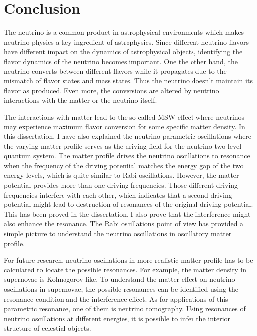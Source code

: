 \chapter{\label{chap:conclusion}Conclusion}


The neutrino is a common product in astrophysical environments which makes neutrino physics a key ingredient of astrophysics. Since different neutrino flavors have different impact on the dynamics of astrophysical objects, identifying the flavor dynamics of the neutrino becomes important. One the other hand, the neutrino converts between different flavors while it propagates due to the mismatch of flavor states and mass states. Thus the neutrino doesn't maintain its flavor as produced. Even more, the conversions are altered by neutrino interactions with the matter or the neutrino itself. 

The interactions with matter lead to the so called MSW effect where neutrinos may experience maximum flavor conversion for some specific matter density. In this dissertation, I have also explained the neutrino parametric oscillations where the varying matter profile serves as the driving field for the neutrino two-level quantum system. The matter profile drives the neutrino oscillations to resonance when the frequency of the driving potential matches the energy gap of the two energy levels, which is quite similar to Rabi oscillations. However, the matter potential provides more than one driving frequencies. Those different driving frequencies interfere with each other, which indicates that a second driving potential might lead to destruction of resonances of the original driving potential. This has been proved in the dissertation. I also prove that the interference might also enhance the resonance. The Rabi oscillations point of view has provided a simple picture to understand the neutrino oscillations in oscillatory matter profile.

For future research, neutrino oscillations in more realistic matter profile has to be calculated to locate the possible resonances. For example, the matter density in supernovae is Kolmogorov-like. To understand the matter effect on neutrino oscillations in supernovae, the possible resonances can be identified using the resonance condition and the interference effect. As for applications of this parametric resonance, one of them is neutrino tomography. Using resonances of neutrino oscillations at different energies, it is possible to infer the interior structure of celestial objects.

